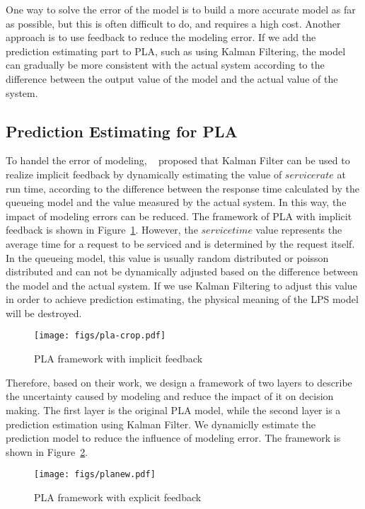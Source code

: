 \documentclass[sigconf]{acmart}
\begin{document}
	
	One way to solve the error of the model is to build a more accurate model as far as possible, but this is often difficult to do, and requires a high cost. Another approach is to use feedback to reduce the modeling error. If we add the prediction estimating part to PLA, such as using Kalman Filtering, the model can gradually be more consistent with the actual system according to the difference between the output value of the model and the actual value of the system.
	
	
	\subsection{Prediction Estimating for PLA}
	
	To handel the error of modeling, ~\cite{Moreno2017AdaptationTI} proposed that Kalman Filter can be used to realize implicit feedback by dynamically estimating the value of $service rate$ at run time, according to the difference between the response time calculated by the queueing model and the value measured by the actual system. In this way, the impact of modeling errors can be reduced. The framework of PLA with implicit feedback is shown in Figure~\ref{fig:pla}.
	However, the $servicetime$ value represents the average time for a request to be serviced and is determined by the request itself. In the queueing model, this value is usually random distributed or poisson distributed and can not be dynamically adjusted based on the difference between the model and the actual system. If we use Kalman Filtering to adjust this value in order to achieve prediction estimating, the physical meaning of the LPS model will be destroyed.
	\begin{figure}[!htp]
		\centering	
		\texttt{[image: figs/pla-crop.pdf]}
		\label{fig:pla}
		\caption{PLA framework with implicit feedback}
	\end{figure}
	
	Therefore, based on their work, we design a framework of two layers to describe the uncertainty caused by modeling and reduce the impact of it on decision making. The first layer is the original PLA model, while the second layer is a prediction estimation using Kalman Filter. We dynamiclly estimate the prediction model to reduce the influence of modeling error. The framework is shown in Figure~\ref{fig:planew}.
	\begin{figure}[!htp]
		\centering	
		\texttt{[image: figs/planew.pdf]}
		\label{fig:planew}
		\caption{PLA framework with explicit feedback}
	\end{figure}
	
\end{document}
